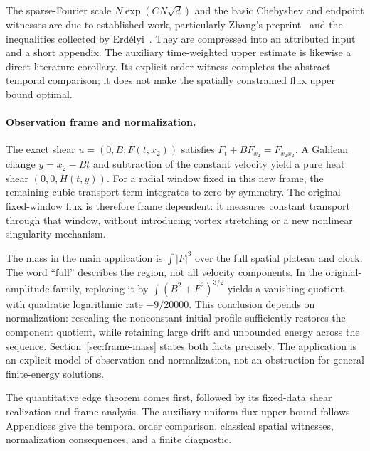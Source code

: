 \documentclass[11pt]{article}
\theoremstyle{definition}
\begin{document}
The sparse-Fourier scale $N\exp(CN\sqrt d)$ and the basic Chebyshev
and endpoint witnesses are due to established work, particularly
Zhang's preprint~\cite{Zhang2026} and the inequalities collected by
Erd\'elyi~\cite{Erdelyi2017}. They are compressed into an attributed
input and a short appendix. The auxiliary time-weighted upper estimate
is likewise a direct literature corollary. Its explicit order witness
completes the abstract temporal comparison; it does not make the
spatially constrained flux upper bound optimal.

\paragraph{Observation frame and normalization.}
The exact shear $u=(0,B,F(t,x_2))$ satisfies
$F_t+BF_{x_2}=F_{x_2x_2}$. A Galilean change
$y=x_2-Bt$ and subtraction of the constant velocity yield a pure heat
shear $(0,0,H(t,y))$. For a radial window fixed in this new frame,
the remaining cubic transport term integrates to zero by symmetry.
The original fixed-window flux is therefore frame dependent: it
measures constant transport through that window, without introducing
vortex stretching or a new nonlinear singularity mechanism.

The mass in the main application is $\int|F|^3$ over the full spatial
plateau and clock. The word ``full'' describes the region, not all
velocity components. In the original-amplitude family, replacing it by
$\int(B^2+F^2)^{3/2}$ yields a vanishing quotient with quadratic
logarithmic rate $-9/20000$. This conclusion depends on normalization:
rescaling the nonconstant initial profile sufficiently restores the
component quotient, while retaining large drift and unbounded energy
across the sequence. Section~\ref{sec:frame-mass} states both facts
precisely. The application is an explicit model of observation and
normalization, not an obstruction for general finite-energy solutions.

The quantitative edge theorem comes first, followed by its fixed-data
shear realization and frame analysis. The auxiliary uniform flux upper
bound follows. Appendices give the temporal order comparison, classical
spatial witnesses, normalization consequences, and a finite diagnostic.







\appendix





\begingroup
\small
\setlength{\bibsep}{4pt}


\endgroup
\end{document}
